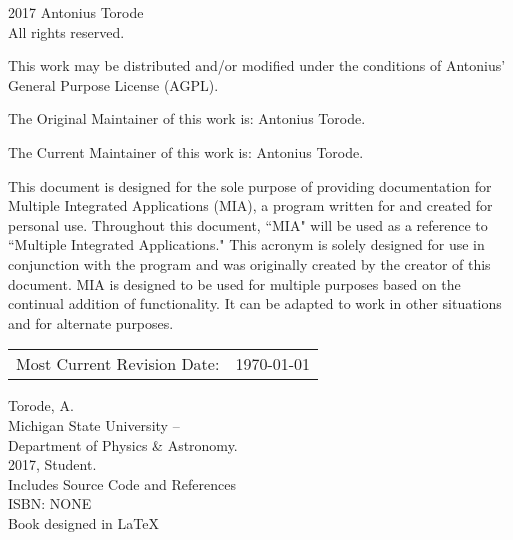 \pagestyle{empty}
\begingroup
\footnotesize
\parindent 0pt
\parskip \baselineskip
\textcopyright{} 2017 Antonius Torode \\
All rights reserved.

This work may be distributed and/or modified under the conditions of Antonius’ General Purpose License (AGPL).

The Original Maintainer of this work is: Antonius Torode.

The Current Maintainer of this work is: Antonius Torode.

This document is designed for the sole purpose of providing documentation for Multiple Integrated Applications (MIA), a program written for and created for personal use. Throughout this document, ``MIA" will be used as a reference to ``Multiple Integrated Applications." This acronym is solely designed for use in conjunction with the program and was originally created by the creator of this document. MIA is designed to be used for multiple purposes based on the continual addition of functionality. It can be adapted to work in other situations and for alternate purposes.


\begin{center}
\begin{tabular}{ll}
Most Current Revision Date: &  \today 
\end{tabular}
\end{center}

\vfill

Torode, A.\\
\hspace*{2em} Michigan State University -- \\
\hspace*{2em} Department of Physics \& Astronomy. \\
\hspace*{2em} 2017, Student. \\
\hspace*{2em} Includes Source Code and References \\
\hspace*{2em} ISBN: NONE \\
\hspace*{2em} Book designed in \LaTeX



\endgroup
\clearpage
